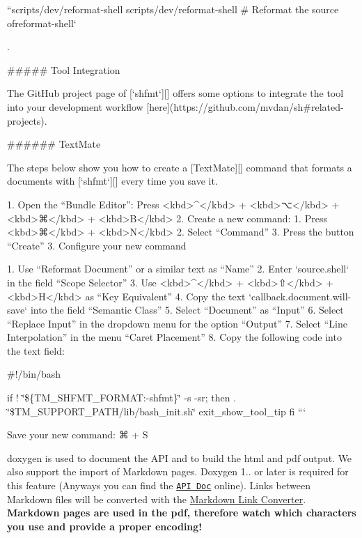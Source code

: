 ``{\ttfamily  scripts/dev/reformat-\/shell scripts/dev/reformat-\/shell \# Reformat the source of}reformat-\/shell` 
\begin{DoxyCode}
.

##### Tool Integration

The GitHub project page of [`shfmt`][] offers some options to integrate the tool into your development
       workflow [here](https://github.com/mvdan/sh#related-projects).

###### TextMate

The steps below show you how to create a [TextMate][] command that formats a documents with [`shfmt`][]
       every time you save it.

1. Open the “Bundle Editor”: Press <kbd>^</kbd> + <kbd>⌥</kbd> + <kbd>⌘</kbd> + <kbd>B</kbd>
2. Create a new command:
   1. Press <kbd>⌘</kbd> + <kbd>N</kbd>
   2. Select “Command”
   3. Press the button “Create”
3. Configure your new command

   1. Use “Reformat Document” or a similar text as “Name”
   2. Enter `source.shell` in the field “Scope Selector”
   3. Use <kbd>^</kbd> + <kbd>⇧</kbd> + <kbd>H</kbd> as “Key Equivalent”
   4. Copy the text `callback.document.will-save` into the field “Semantic Class”
   5. Select “Document” as “Input”
   6. Select “Replace Input” in the dropdown menu for the option “Output”
   7. Select “Line Interpolation” in the menu “Caret Placement”
   8. Copy the following code into the text field:
\end{DoxyCode}
 \#!/bin/bash

if ! \char`\"{}\$\{\+T\+M\+\_\+\+S\+H\+F\+M\+T\+\_\+\+F\+O\+R\+M\+A\+T\+:-\/shfmt\}\char`\"{} -\/s -\/sr; then . \char`\"{}\$\+T\+M\+\_\+\+S\+U\+P\+P\+O\+R\+T\+\_\+\+P\+A\+T\+H/lib/bash\+\_\+init.\+sh\char`\"{} exit\+\_\+show\+\_\+tool\+\_\+tip fi ```


\begin{DoxyEnumerate}
\item Save your new command\+: {\ttfamily ⌘} + {\ttfamily S}
\end{DoxyEnumerate}

{\ttfamily doxygen} is used to document the A\+PI and to build the html and pdf output. We also support the import of Markdown pages. Doxygen 1.. or later is required for this feature (Anyways you can find the \href{https://doc.libelektra.org/api/latest/html/}{\tt A\+PI Doc} online). Links between Markdown files will be converted with the \hyperlink{doc_markdownlinkconverter_README_md}{Markdown Link Converter}. {\bfseries Markdown pages are used in the pdf, therefore watch which characters you use and provide a proper encoding!}


